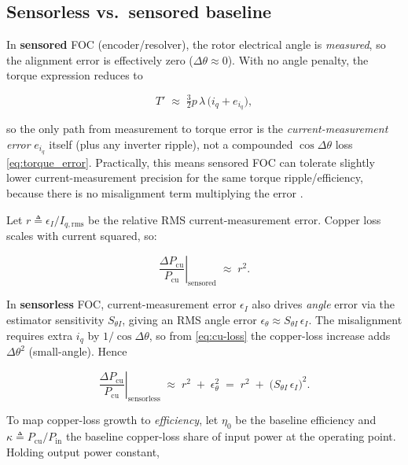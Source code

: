 \documentclass[conference]{IEEEtran}
\begin{document}
\subsection{Sensorless vs.\ sensored baseline}
In \textbf{sensored} FOC (encoder/resolver), the rotor electrical angle is \emph{measured}, so the alignment error is effectively zero (\(\Delta\theta \approx 0\)). With no angle penalty, the torque expression reduces to

\begin{equation}
T' \;\approx\; \tfrac{3}{2}p\,\lambda\,\big(i_q + e_{i_q}\big),
\end{equation}

so the only path from measurement to torque error is the \emph{current-measurement error} \(e_{i_q}\) itself (plus any inverter ripple), not a compounded \(\cos\Delta\theta\) loss \ref{eq:torque_error}. Practically, this means sensored FOC can tolerate slightly lower current-measurement precision for the same torque ripple/efficiency, because there is no misalignment term multiplying the error \cite{Krishnan2010}.

\medskip
Let \(r \triangleq \epsilon_I / I_{q,\mathrm{rms}}\) be the relative RMS current-measurement error. Copper loss scales with current squared, so:

\begin{equation}
\left.\frac{\Delta P_{\mathrm{cu}}}{P_{\mathrm{cu}}}\right|_{\text{sensored}}
\;\approx\; r^2 .
\end{equation}

In \textbf{sensorless} FOC, current-measurement error \(\epsilon_I\) also drives \emph{angle} error via the estimator sensitivity \(S_{\theta I}\), giving an RMS angle error \(\epsilon_\theta \approx S_{\theta I}\,\epsilon_I\). The misalignment requires extra \(i_q\) by \(1/\cos\Delta\theta\), so from \eqref{eq:cu-loss} the copper-loss increase adds \(\Delta\theta^2\) (small-angle). Hence


\begin{equation}
\left.\frac{\Delta P_{\mathrm{cu}}}{P_{\mathrm{cu}}}\right|_{\text{sensorless}}
\;\approx\; r^2 \;+\; \epsilon_\theta^2
\;=\; r^2 \;+\; \big(S_{\theta I}\,\epsilon_I\big)^2 .
\end{equation}

To map copper-loss growth to \emph{efficiency}, let \(\eta_0\) be the baseline efficiency and \(\kappa\!\triangleq\!P_{\mathrm{cu}}/P_{\mathrm{in}}\) the baseline copper-loss share of input power at the operating point. Holding output power constant,
\end{document}
